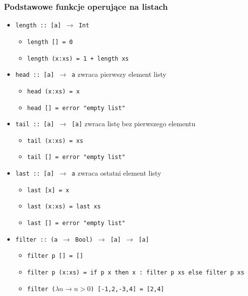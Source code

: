 \documentclass{article}
\begin{document}
\subsubsection{Podstawowe funkcje operujące na listach}
\begin{itemize}
    \item \texttt{length :: [a] \(\to\) Int}
        \begin{itemize}
            \item \texttt{length [] = 0}
            \item \texttt{length (x:xs) = 1 + length xs}
        \end{itemize}
    \item \texttt{head :: [a] \(\to\) a} \newline
        zwraca pierwszy element listy
        \begin{itemize}
            \item \texttt{head (x:xs) = x}
            \item \texttt{head [] = error "empty list"}
        \end{itemize}
    \item \texttt{tail :: [a] \(\to\) [a]} \newline
        zwraca listę bez pierwszego elementu
        \begin{itemize}
            \item \texttt{tail (x:xs) = xs}
            \item \texttt{tail [] = error "empty list"}
        \end{itemize}
    \item \texttt{last :: [a] \(\to\) a} \newline
        zwraca ostatni element listy
        \begin{itemize}
            \item \texttt{last [x] = x}
            \item \texttt{last (x:xs) = last xs}
            \item \texttt{last [] = error "empty list"}
        \end{itemize}
    \item \texttt{filter :: (a \(\to\) Bool) \(\to\) [a] \(\to\) [a]}
        \begin{itemize}
            \item \texttt{filter p [] = []}
            \item \texttt{filter p (x:xs) = if p x then x : filter p xs else filter p xs}
            \item \texttt{filter (\(\lambda n \to n > 0\)) [-1,2,-3,4] = [2,4]}

\end{itemize}
\end{itemize}
\end{document}
